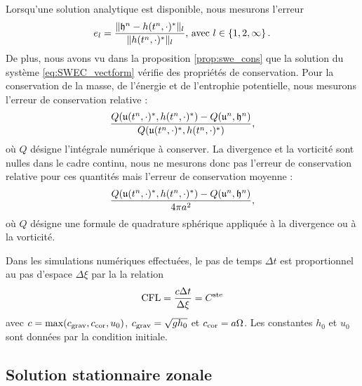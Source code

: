Lorsqu'une solution analytique est disponible, nous mesurons l'erreur
\begin{equation}
e_l = \dfrac{\| \mathfrak{h}^n - h(t^n,\cdot)^* \|_l}{\| h(t^n,\cdot)^* \|_l} \text{, avec } l \in \left\lbrace 1, 2, \infty \right\rbrace.
\end{equation}
De plus, nous avons vu dans la proposition \ref{prop:swe_cons} que la solution du système \eqref{eq:SWEC_vectform} vérifie des propriétés de conservation. Pour la conservation de la masse, de l'énergie et de l'entrophie potentielle, nous mesurons l'erreur de conservation relative :
\begin{equation}
\dfrac{Q(\mathfrak{u}(t^n,\cdot)^*, h(t^n,\cdot)^*) - Q(\mathfrak{u}^n, \mathfrak{h}^n)}{Q(\mathfrak{u}(t^n,\cdot)^*, h(t^n,\cdot)^*)},
\end{equation}
où $Q$ désigne l'intégrale numérique à conserver.
La divergence et la vorticité sont nulles dans le cadre continu, nous ne mesurons donc pas l'erreur de conservation relative pour ces quantités mais l'erreur de conservation moyenne :
\begin{equation}
\dfrac{Q(\mathfrak{u}(t^n,\cdot)^*, h(t^n,\cdot)^*) - Q(\mathfrak{u}^n, \mathfrak{h}^n)}{4 \pi a^2},
\end{equation}
où $Q$ désigne une formule de quadrature sphérique appliquée à la divergence ou à la vorticité.

Dans les simulations numériques effectuées, le pas de temps $\Delta t$ est proportionnel au pas d'espace $\Delta \xi$ par la la relation
\begin{equation}
\text{CFL} = \dfrac{c \Delta t}{\Delta \xi} = C^{\text{ste}}
\end{equation}
avec $c = \max (c_{\text{grav}}, c_{\text{cor}}, u_0)$, $c_{\text{grav}} = \sqrt{gh_0}$ et $c_{\text{cor}} = a \Omega$. Les constantes $h_0$ et $u_0$ sont données par la condition initiale.






















\subsection{Solution stationnaire zonale}

